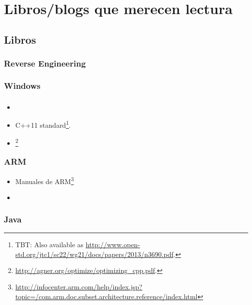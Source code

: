 \part{Libros/blogs que merecen lectura}

\chapter{Libros}

\section{Reverse Engineering}



\section{Windows}



\section{\CCpp}

\begin{itemize}
\item \KRBook

\item C++11 standard\footnote{\ac{TBT}: Also available as \url{http://www.open-std.org/jtc1/sc22/wg21/docs/papers/2013/n3690.pdf}.}.

\item [\AgnerFogCPP]\footnote{\AlsoAvailableAs \url{http://agner.org/optimize/optimizing_cpp.pdf}.}
\end{itemize}

\section{ARM}

\begin{itemize}
\item Manuales de ARM\footnote{\AlsoAvailableAs \url{http://infocenter.arm.com/help/index.jsp?topic=/com.arm.doc.subset.architecture.reference/index.html}}

\item \ARMSixFourRefURL
\end{itemize}

\section{Java}

